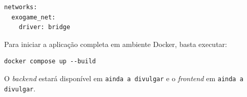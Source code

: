 \documentclass[
	12pt,
	openany,
	oneside,
	a4paper,
	english,
	brazil
]{abntex2}
\begin{document}
\begin{apendicesenv}
\begin{lstlisting}[caption={docker-compose.yml -- orquestração dos serviços ExoGame (backend Phoenix/Elixir)},
                   label={lst:docker_compose}]
networks:
  exogame_net:
    driver: bridge
\end{lstlisting}

Para iniciar a aplicação completa em ambiente Docker, basta executar:

\begin{lstlisting}[language={}]
docker compose up --build
\end{lstlisting}

O \textit{backend} estará disponível em \texttt{ainda a divulgar} e o \textit{frontend} em \texttt{ainda a divulgar}.
\end{apendicesenv}

\printindex
\end{document}
